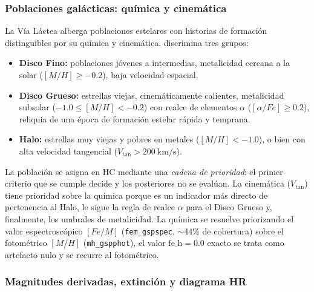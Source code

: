 \subsubsection{Poblaciones galácticas: química y cinemática}
\label{sec:fund-pob}

La Vía Láctea alberga poblaciones estelares con historias de formación
distinguibles por su química y cinemática. \STELLAR{} discrimina tres grupos:

\begin{itemize}
  \item \textbf{Disco Fino:} poblaciones jóvenes a intermedias, metalicidad
  cercana a la solar ($[M/H] \ge -0.2$), baja velocidad espacial.
  \item \textbf{Disco Grueso:} estrellas viejas, cinemáticamente calientes,
  metalicidad subsolar ($-1.0 \le [M/H] < -0.2$) con realce de elementos
  $\alpha$ ($[\alpha/Fe] \ge 0.2$), reliquia de una época de formación estelar
  rápida y temprana.
  \item \textbf{Halo:} estrellas muy viejas y pobres en metales
  ($[M/H] < -1.0$), o bien con alta velocidad tangencial
  ($V_\mathrm{tan} > \SI{200}{\kilo\meter\per\second}$).
\end{itemize}

La población se asigna en HC mediante una \emph{cadena de prioridad}: el primer
criterio que se cumple decide y los posteriores no se evalúan. La cinemática
($V_\mathrm{tan}$) tiene prioridad sobre la química porque es un indicador más
directo de pertenencia al Halo, le sigue la regla de realce $\alpha$ para el
Disco Grueso y, finalmente, los umbrales de metalicidad. La química se resuelve
priorizando el valor espectroscópico $[Fe/M]$ (\verb|fem_gspspec|, $\sim$44\%
de cobertura) sobre el fotométrico $[M/H]$ (\verb|mh_gspphot|), el valor
$\mathrm{fe\_h}=0.0$ exacto se trata como artefacto nulo y se recurre al
fotométrico.

\subsubsection{Magnitudes derivadas, extinción y diagrama HR}
\label{sec:fund-hr}


